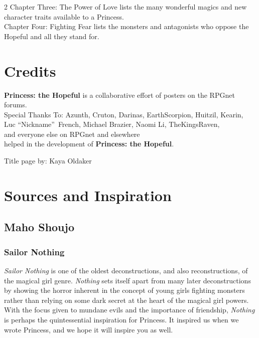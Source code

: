 \begin{multicols}{2}
\noindent Chapter Three: The Power of Love lists the many wonderful magics and new character traits available to a Princess. \\

\noindent Chapter Four: Fighting Fear lists the monsters and antagonists who oppose the Hopeful and all they stand for.

\section*{Credits}

\textbf{Princess: the Hopeful} is a collaborative effort of posters on the RPGnet forums. \\
Special Thanks To: Azunth, Cruton, Darinas, EarthScorpion, Huitzil, Kearin,\\ Luc \textquotedblleft Nickname\textquotedblright\, French, Michael Brazier, Naomi Li, TheKingsRaven,\\ and everyone else on RPGnet and elsewhere \\ helped in the development of \textbf{Princess: the Hopeful}. 

Title page by: Kaya Oldaker

\section*{Sources and Inspiration}
\subsection*{Maho Shoujo}

\subsubsection*{Sailor Nothing}

\textit{Sailor Nothing} is one of the oldest deconstructions, and also reconstructions, of the magical girl genre. \textit{Nothing} sets itself apart from many later deconstructions by showing the horror inherent in the concept of young girls fighting monsters rather than relying on some dark secret at the heart of the magical girl powers. With the focus given to mundane evils and the importance of friendship, \textit{Nothing} is perhaps the quintessential inspiration for Princess. It inspired us when we wrote Princess, and we hope it will inspire you as well. 


\end{multicols}
